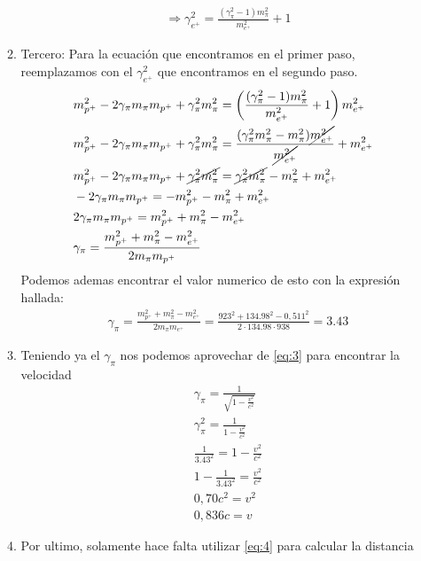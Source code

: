 \documentclass[12pt]{exam}
\begin{document}
\begin{enumerate}
\begin{enumerate}
\begin{align*}
          &\Rightarrow \gamma_{e^+}^2 = \frac{(\gamma_{\pi}^2-1)m_{\pi}^2}{m_{e^+}^2}+1
        \end{align*}
      \item Tercero: Para la ecuación que encontramos en el primer paso, reemplazamos con el $\gamma_{e^+}^2$ que encontramos en el segundo paso.
        \begin{align*}
          & m_{p^+}^2 - 2\gamma_{\pi}m_{\pi}m_{p^+} + \gamma_{\pi}^2m_{\pi}^2 = \left(\frac{(\gamma_{\pi}^2-1)m_{\pi}^2}{m_{e^+}^2}+1\right)m_{e^+}^2\\
          & m_{p^+}^2 - 2\gamma_{\pi}m_{\pi}m_{p^+} + \gamma_{\pi}^2m_{\pi}^2 = \frac{(\gamma_{\pi}^2m_{\pi}^2-m_{\pi}^2)\cancel{m_{e^+}^2}}{\cancel{m_{e^+}^2}} + m_{e^+}^2\\
          & m_{p^+}^2 - 2\gamma_{\pi}m_{\pi}m_{p^+} + \cancel{\gamma_{\pi}^2m_{\pi}^2} = \cancel{\gamma_{\pi}^2m_{\pi}^2} - m_{\pi}^2 + m_{e^+}^2\\
          & -2\gamma_{\pi}m_{\pi}m_{p^+} = -m_{p^+}^2 - m_{\pi}^2 + m_{e^+}^2\\
          & 2\gamma_{\pi}m_{\pi}m_{p^+} = m_{p^+}^2 + m_{\pi}^2 - m_{e^+}^2\\
          & \gamma_{\pi} = \frac{m_{p^+}^2+m_{\pi}^2-m_{e^+}^2}{2m_{\pi}m_{p^+}}
        \end{align*}
        Podemos ademas encontrar el valor numerico de esto con la expresión hallada:
        \begin{align*}
          &\gamma_{\pi} = \frac{m_{p^+}^2+m_{\pi}^2-m_{e^+}^2}{2m_{\pi}m_{e^+}} = \frac{923^2+134.98^2-0,511^2}{2\cdot134.98\cdot 938} = 3.43
        \end{align*}
      \item Teniendo ya el $\gamma_\pi$ nos podemos aprovechar de \ref{eq:3} para encontrar la velocidad
        \begin{align*}
          &\gamma_{\pi} = \frac{1}{\sqrt{1-\frac{v^2}{c^2}}}\\
          &\gamma_{\pi}^2 = \frac{1}{1-\frac{v^2}{c^2}}\\
          &\frac{1}{3.43^2} = 1-\frac{v^2}{c^2}\\
          & 1-\frac{1}{3.43^2} = \frac{v^2}{c^2}\\
          & 0,70c^2 = v^2\\
          & 0,836c = v
        \end{align*}
      \item Por ultimo, solamente hace falta utilizar \ref{eq:4} para calcular la distancia
        \begin{align*}

\end{align*}
\end{enumerate}
\end{enumerate}
\end{document}
